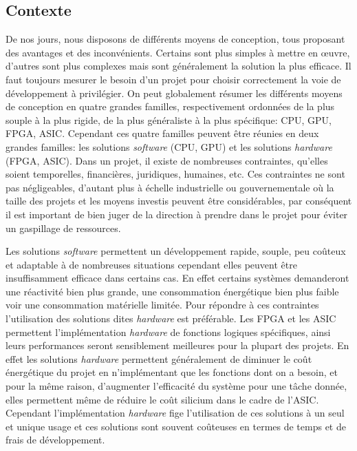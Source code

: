 \documentclass[a4paper,12pt]{article}
\begin{document}
\subsection{Contexte}
De nos jours, nous disposons de différents moyens de conception, tous proposant des avantages et des inconvénients. Certains sont plus simples à mettre en œuvre, d'autres sont plus complexes mais sont généralement la solution la plus efficace. Il faut toujours mesurer le besoin d'un projet pour choisir correctement la voie de développement à privilégier.
On peut globalement résumer les différents moyens de conception en quatre grandes familles, respectivement ordonnées de la plus souple à la plus rigide, de la plus généraliste à la plus spécifique: CPU, GPU, FPGA, ASIC. Cependant ces quatre familles peuvent être réunies en deux grandes familles: les solutions \textit{software} (CPU, GPU) et les solutions \textit{hardware} (FPGA, ASIC).
Dans un projet, il existe de nombreuses contraintes, qu'elles soient temporelles, financières, juridiques, humaines, etc. Ces contraintes ne sont pas négligeables, d'autant plus à échelle industrielle ou gouvernementale où la taille des projets et les moyens investis peuvent être considérables, par conséquent il est important de bien juger de la direction à prendre dans le projet pour éviter un gaspillage de ressources. \newline

Les solutions \textit{software} permettent un développement rapide, souple, peu coûteux et adaptable à de nombreuses situations cependant elles peuvent être insuffisamment efficace dans certains cas. En effet certains systèmes demanderont une réactivité bien plus grande, une consommation énergétique bien plus faible voir une consommation matérielle limitée. Pour répondre à ces contraintes l'utilisation des solutions dites \textit{hardware} est préférable. Les FPGA et les ASIC permettent l'implémentation \textit{hardware} de fonctions logiques spécifiques, ainsi leurs performances seront sensiblement meilleures pour la plupart des projets. En effet les solutions \textit{hardware} permettent généralement de diminuer le coût énergétique du projet en n'implémentant que les fonctions dont on a besoin, et pour la même raison, d'augmenter l'efficacité du système pour une tâche donnée, elles permettent même de réduire le coût silicium dans le cadre de l'ASIC. Cependant l'implémentation \textit{hardware} fige l'utilisation de ces solutions à un seul et unique usage et ces solutions sont souvent coûteuses en termes de temps et de frais de développement.\newline
\end{document}
